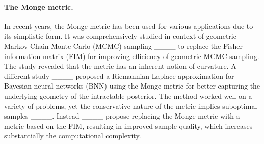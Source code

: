 
\paragraph{The Monge metric.} 
In recent years, the Monge metric has been used for various applications due to its simplistic form. It was comprehensively studied in context of geometric Markov Chain Monte Carlo (MCMC) sampling ____ to replace the Fisher information matrix (FIM) for improving efficiency of geometric MCMC sampling. The study revealed that the metric has an inherent notion of curvature. A different study ____ proposed a Riemannian Laplace approximation for Bayesian neural networks (BNN) using the Monge metric for better capturing the underlying geometry of the intractable posterior. The method worked well on a variety of problems, yet the conservative nature of the metric implies suboptimal samples
____. Instead ____ propose replacing the Monge metric with a metric based on the FIM, resulting in improved sample quality, which increases substantially the computational complexity.